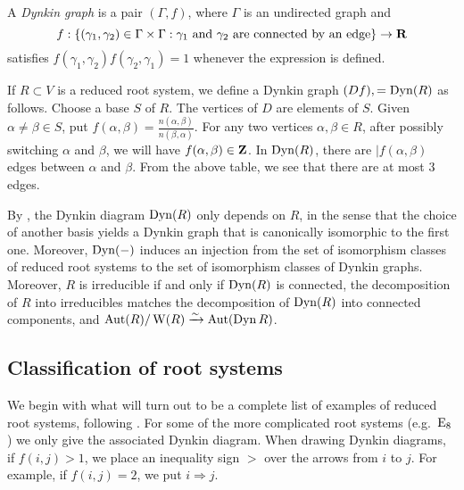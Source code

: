 \begin{definition}
A \emph{Dynkin graph} is a pair $(\Gamma,f)$, where $\Gamma$ is an 
undirected graph and 
\[
  f:\{(\gamma_1,\gamma_2)\in \Gamma\times\Gamma:\text{$\gamma_1$ and $\gamma_2$ are connected by an edge}\}\to \mathbf{R} 
\]
satisfies $f(\gamma_1,\gamma_2)f(\gamma_2,\gamma_1)=1$ whenever the expression 
is defined. 
\end{definition}

If $R\subset V$ is a reduced root system, we define a Dynkin graph 
$(Df),=\operatorname{Dyn}(R)$ as follows. Choose a base $S$ of $R$. The vertices of $D$ 
are elements of $S$. Given $\alpha\ne\beta\in S$, put 
$f(\alpha,\beta)=\frac{n(\alpha,\beta)}{n(\beta,\alpha)}$. For any two 
vertices $\alpha,\beta\in R$, after possibly switching $\alpha$ and 
$\beta$, we will have $f(\alpha,\beta)\in \mathbf{Z}$. In $\operatorname{Dyn}(R)$, there are 
$|f(\alpha,\beta)$ edges between $\alpha$ and $\beta$. From the above table, 
we see that there are at most $3$ edges. 

By \cite[VI \S 4.2]{bourbaki-lie-alg-4-6}, the Dynkin diagram $\operatorname{Dyn}(R)$ 
only depends on $R$, in the sense that the choice of another basis yields a 
Dynkin graph that is canonically isomorphic to the first one. Moreover, 
$\operatorname{Dyn}(-)$ induces an injection from the set of isomorphism classes of 
reduced root systems to the set of isomorphism classes of Dynkin graphs. 
Moreover, $R$ is irreducible if and only if $\operatorname{Dyn}(R)$ is connected, the 
decomposition of $R$ into irreducibles matches the decomposition of 
$\operatorname{Dyn}(R)$ into connected components, and 
$\operatorname{Aut}(R)/\operatorname{W}(R)\xrightarrow\sim \operatorname{Aut}(\operatorname{Dyn} R)$. 





\subsection{Classification of root systems}

We begin with what will turn out to be a complete list of examples of reduced 
root systems, following \cite[VI \S4]{bourbaki-lie-alg-4-6}. For some of the 
more complicated root systems (e.g.~$\mathrm{E}_8$) we only give the associated 
Dynkin diagram. When drawing Dynkin diagrams, if $f(i,j)>1$, we place an 
inequality sign $>$ over the arrows from $i$ to $j$. For example, if 
$f(i,j)=2$, we put $i\Rightarrow j$. 


